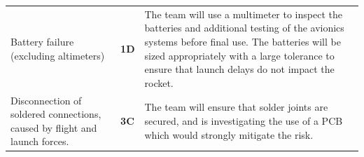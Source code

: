 \begin{table}[htbp]
\begin{tabularx}{\linewidth}{X >{\centering\arraybackslash}m{1in} X}
  Battery failure (excluding altimeters) & \cellcolor{orange!25}\textbf{\newline \newline  \newline \newline  1D} & The team will use a multimeter to inspect the batteries and additional testing of the avionics systems before final use. The batteries will be sized appropriately with a large tolerance to ensure that launch delays do not impact the rocket. \\
  Disconnection of soldered connections, caused by flight and launch forces. & \cellcolor{orange!25}\textbf{\newline \newline \newline 3C} & The team will ensure that solder joints are secured, and is investigating the use of a PCB which would strongly mitigate the risk. \\

      \bottomrule
      \end{tabularx}%
    \label{tab:addlabel}%
  \end{table}%

  


